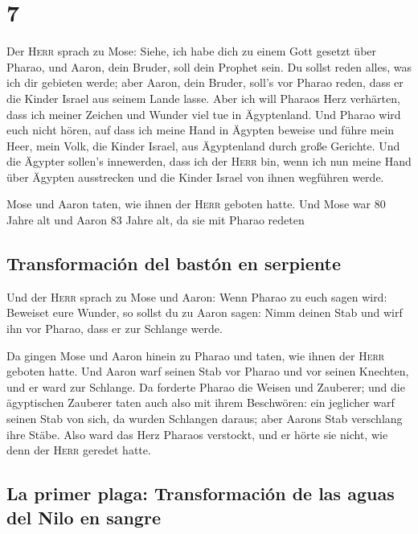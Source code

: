 \hypertarget{section-6}{%
\section{7}\label{section-6}}

 Der \textsc{Herr} sprach zu Mose: Siehe, ich habe dich zu
einem Gott gesetzt über Pharao, und Aaron, dein Bruder, soll dein
Prophet sein.  Du sollst reden alles, was ich dir gebieten
werde; aber Aaron, dein Bruder, soll's vor Pharao reden, dass er die
Kinder Israel aus seinem Lande lasse.  Aber ich will
Pharaos Herz verhärten, dass ich meiner Zeichen und Wunder viel tue in
Ägyptenland.  Und Pharao wird euch nicht hören, auf dass
ich meine Hand in Ägypten beweise und führe mein Heer, mein Volk, die
Kinder Israel, aus Ägyptenland durch große Gerichte.  Und
die Ägypter sollen's innewerden, dass ich der \textsc{Herr} bin, wenn
ich nun meine Hand über Ägypten ausstrecken und die Kinder Israel von
ihnen wegführen werde.

 Mose und Aaron taten, wie ihnen der \textsc{Herr} geboten
hatte.  Und Mose war 80 Jahre alt und Aaron 83 Jahre alt,
da sie mit Pharao redeten

\hypertarget{transformaciuxf3n-del-bastuxf3n-en-serpiente}{%
\subsection{Transformación del bastón en
serpiente}\label{transformaciuxf3n-del-bastuxf3n-en-serpiente}}

 Und der \textsc{Herr} sprach zu Mose und Aaron:
 Wenn Pharao zu euch sagen wird: Beweiset eure Wunder, so
sollst du zu Aaron sagen: Nimm deinen Stab und wirf ihn vor Pharao, dass
er zur Schlange werde.

 Da gingen Mose und Aaron hinein zu Pharao und taten, wie
ihnen der \textsc{Herr} geboten hatte. Und Aaron warf seinen Stab vor
Pharao und vor seinen Knechten, und er ward zur Schlange.
 Da forderte Pharao die Weisen und Zauberer; und die
ägyptischen Zauberer taten auch also mit ihrem Beschwören:
 ein jeglicher warf seinen Stab von sich, da wurden
Schlangen daraus; aber Aarons Stab verschlang ihre Stäbe.
 Also ward das Herz Pharaos verstockt, und er hörte sie
nicht, wie denn der \textsc{Herr} geredet hatte.

\hypertarget{la-primer-plaga-transformaciuxf3n-de-las-aguas-del-nilo-en-sangre}{%
\subsection{La primer plaga: Transformación de las aguas del Nilo en
sangre}\label{la-primer-plaga-transformaciuxf3n-de-las-aguas-del-nilo-en-sangre}}

